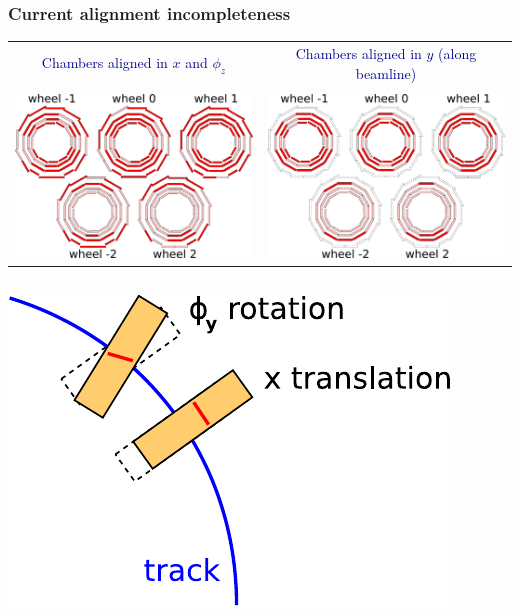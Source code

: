 \documentclass[compress]{beamer}
\begin{document}
\begin{frame}
\frametitle{Current alignment incompleteness}

\begin{tabular}{c c}
\textcolor{darkblue}{Chambers aligned in $x$ and $\phi_z$} & \textcolor{darkblue}{Chambers aligned in $y$ (along beamline)} \\
& \\
\includegraphics[width=0.45\linewidth]{aligned_rphi.pdf} & \includegraphics[width=0.45\linewidth]{aligned_z.pdf}
\end{tabular}

\vspace{-0.25 cm}
\begin{columns}

\vspace{1 cm}
\includegraphics[width=\linewidth]{phiy_also_important.pdf}


\end{columns}
\end{frame}
\end{document}
